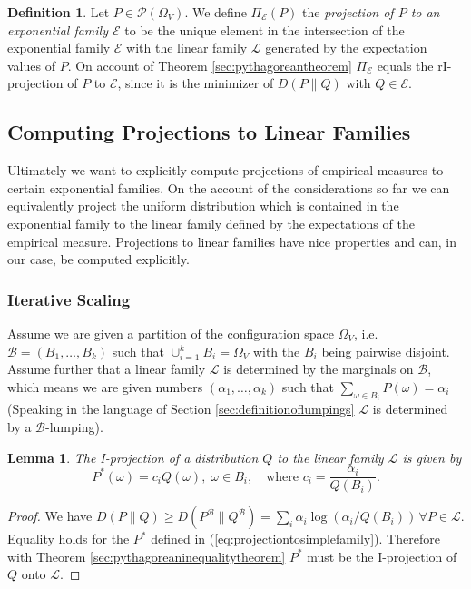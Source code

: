 \documentclass[12pt]{amsart}
\newcommand{\ie}{i.e.\;}  %
\theoremstyle{plain}%
\newtheorem{lem}[thm]{Lemma}
\theoremstyle{definition}
\newtheorem{defn}[thm]{Definition}
\theoremstyle{remark}
\begin{document}
\begin{defn}
  Let $P\in\mathcal{P}(\Omega_V)$. We define $\Pi_{\mathcal{E}} (P)$
  the \emph{projection of $P$ to an exponential family $\mathcal{E}$}
   to be the unique element in
  the intersection of the exponential family $\mathcal{E}$ with the
  linear family $\mathcal{L}$ generated by the expectation values of
  $P$. On account of Theorem \ref{sec:pythagoreantheorem}
  $\Pi_{\mathcal{E}}$ equals the rI-projection of $P$ to
  $\mathcal{E}$, since it is the minimizer of $D(P\parallel Q)$ with
  $Q\in\mathcal{E}$.
\end{defn}


\subsection{Computing Projections to Linear Families}
\label{sec:proj-line-famil}
Ultimately we want to explicitly compute projections of empirical
measures to certain exponential families. On the account of the
considerations so far we can equivalently project the uniform
distribution which is contained in the exponential family to the
linear family defined by the expectations of the empirical measure.
Projections to linear families have nice properties and can, in our
case, be computed explicitly.

\subsubsection{Iterative Scaling}
Assume we are given a partition of the configuration space $\Omega_V$,
\ie $\mathcal{B} = (B_1,\ldots,B_k)$ such that $\cup_{i=1}^k B_i =
\Omega_V$ with the $B_i$ being pairwise disjoint. Assume further that
a linear family $\mathcal{L}$ is determined by the marginals on
$\mathcal{B}$, which means we are given numbers
$(\alpha_1,\ldots,\alpha_k)$ such that $\sum_{\omega \in B_i}
P(\omega) = \alpha_i$ (Speaking in the language of Section
\ref{sec:definitionoflumpings} $\mathcal{L}$ is determined by a
$\mathcal{B}$-lumping).

\begin{lem}
\label{sec:simplescalinglemma}
The I-projection of a distribution $Q$ to the linear family
$\mathcal{L}$ is given by
  \begin{equation}
    \label{eq:projectiontosimplefamily}
    P^*(\omega) = c_i Q(\omega) ,\; \omega\in B_i, \quad 
    \mbox{where } c_i = \frac{\alpha_i}{Q(B_i)}.
  \end{equation}
\end{lem}
\begin{proof}
  We have $D(P\parallel Q) \geq D(P^{\mathcal{B}}\parallel
  Q^{\mathcal{B}}) = \sum_i \alpha_i \log \left(\alpha_i\slash
    Q(B_i)\right) \, \forall P \in \mathcal{L}$. Equality holds for
  the $P^*$ defined in (\ref{eq:projectiontosimplefamily}). Therefore
  with Theorem \ref{sec:pythagoreaninequalitytheorem} $P^*$ must be
  the I-projection of $Q$ onto $\mathcal{L}$.
\end{proof}
\end{document}
